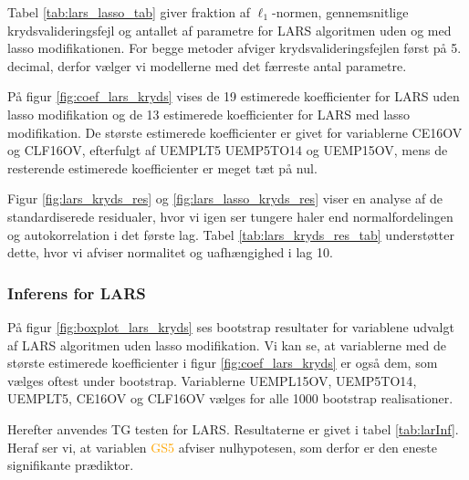 
Tabel \ref{tab:lars_lasso_tab} giver fraktion af \(\ell_1\)-normen, gennemsnitlige krydsvalideringsfejl og antallet af parametre for LARS algoritmen uden og med lasso modifikationen. 
For begge metoder afviger krydsvalideringsfejlen først på 5. decimal, derfor vælger vi modellerne med det færreste antal parametre. 
%

%
På figur \ref{fig:coef_lars_kryds} vises de 19 estimerede koefficienter for LARS uden lasso modifikation og de 13 estimerede koefficienter for LARS med lasso modifikation. 
De største estimerede koefficienter er givet for variablerne \textcolor{blue3}{CE16OV} og \textcolor{blue3}{CLF16OV}, efterfulgt af \textcolor{blue3}{UEMPLT5} \textcolor{blue3}{UEMP5TO14} og \textcolor{blue3}{UEMP15OV}, mens de resterende estimerede koefficienter er meget tæt på nul. 


Figur \ref{fig:lars_kryds_res} og \ref{fig:lars_lasso_kryds_res} viser en analyse af de standardiserede residualer, hvor vi igen ser tungere haler end normalfordelingen og autokorrelation i det første lag. 
Tabel \ref{tab:lars_kryds_res_tab} understøtter dette, hvor vi afviser normalitet og uafhængighed i lag 10. 

\newpage
\subsubsection{Inferens for LARS}
På figur \ref{fig:boxplot_lars_kryds} ses bootstrap resultater for variablene udvalgt af LARS algoritmen uden lasso modifikation. 
Vi kan se, at variablerne med de største estimerede koefficienter i figur \ref{fig:coef_lars_kryds} er også dem, som vælges oftest under bootstrap. 
Variablerne \textcolor{blue3}{UEMPL15OV}, \textcolor{blue3}{UEMP5TO14}, \textcolor{blue3}{UEMPLT5}, \textcolor{blue3}{CE16OV} og \textcolor{blue3}{CLF16OV} vælges for alle 1000 bootstrap realisationer.

Herefter anvendes TG testen for LARS.
Resultaterne er givet i tabel \ref{tab:larInf}.
Heraf ser vi, at variablen \textcolor{orange}{GS5} afviser nulhypotesen, som derfor er den eneste signifikante prædiktor.
%

%

